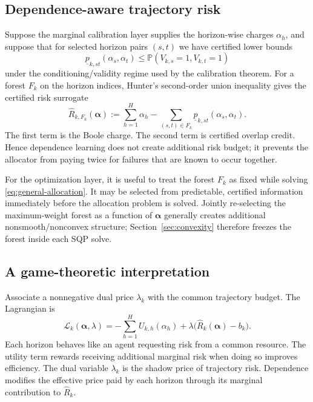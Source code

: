 \documentclass[11pt]{article}
\newcommand{\PP}{\mathbb{P}}
\newcommand{\riskhat}{\widehat R}
\begin{document}
\subsection{Dependence-aware trajectory risk}

Suppose the marginal calibration layer supplies the horizon-wise charges $\alpha_h$, and suppose that for selected horizon pairs $(s,t)$ we have certified lower bounds
\begin{equation}
    \underline p_{k,st}(\alpha_s,\alpha_t)
    \le
    \PP(V_{k,s}=1,V_{k,t}=1)
    \label{eq:pair-lower-bound}
\end{equation}
under the conditioning/validity regime used by the calibration theorem. For a forest $F_k$ on the horizon indices, Hunter's second-order union inequality gives the certified risk surrogate
\begin{equation}
    \riskhat_{k,F_k}(\bm\alpha)
    :=
    \sum_{h=1}^H \alpha_h
    -
    \sum_{(s,t)\in F_k}
    \underline p_{k,st}(\alpha_s,\alpha_t).
    \label{eq:forest-risk}
\end{equation}
The first term is the Boole charge. The second term is certified overlap credit. Hence dependence learning does not create additional risk budget; it prevents the allocator from paying twice for failures that are known to occur together.

For the optimization layer, it is useful to treat the forest $F_k$ as fixed while solving \eqref{eq:general-allocation}. It may be selected from predictable, certified information immediately before the allocation problem is solved. Jointly re-selecting the maximum-weight forest as a function of $\bm\alpha$ generally creates additional nonsmooth/nonconvex structure; Section~\ref{sec:convexity} therefore freezes the forest inside each SQP solve.

\subsection{A game-theoretic interpretation}

Associate a nonnegative dual price $\lambda_k$ with the common trajectory budget. The Lagrangian is
\begin{equation}
    \mathcal L_k(\bm\alpha,\lambda)
    =
    -\sum_{h=1}^H U_{k,h}(\alpha_h)
    +
    \lambda\bigl(\riskhat_k(\bm\alpha)-b_k\bigr).
    \label{eq:general-lagrangian}
\end{equation}
Each horizon behaves like an agent requesting risk from a common resource. The utility term rewards receiving additional marginal risk when doing so improves efficiency. The dual variable $\lambda_k$ is the shadow price of trajectory risk. Dependence modifies the effective price paid by each horizon through its marginal contribution to $\riskhat_k$.
\end{document}

